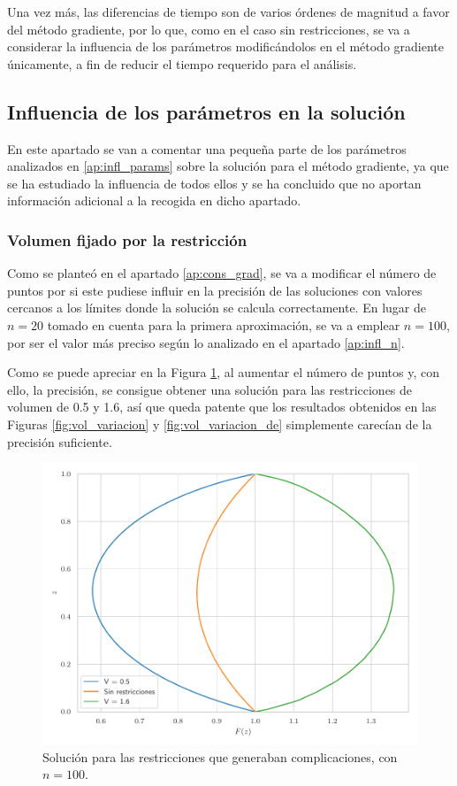 Una vez más, las diferencias de tiempo son de varios órdenes de magnitud a favor del método gradiente, por lo que, como en el caso sin restricciones, se va a considerar la influencia de los parámetros modificándolos en el método gradiente únicamente, a fin de reducir el tiempo requerido para el análisis.

\subsection{Influencia de los parámetros en la solución}

En este apartado se van a comentar una pequeña parte de los parámetros analizados en \ref{ap:infl_params} sobre la solución para el método gradiente, ya que se ha estudiado la influencia de todos ellos y se ha concluido que no aportan información adicional a la recogida en dicho apartado. 

\subsubsection{Volumen fijado por la restricción}

Como se planteó en el apartado \ref{ap:cons_grad}, se va a modificar el número de puntos por si este pudiese influir en la precisión de las soluciones con valores cercanos a los límites donde la solución se calcula correctamente. En lugar de $n = 20$ tomado en cuenta para la primera aproximación, se va a emplear $n = 100$, por ser el valor más preciso según lo analizado en el apartado \ref{ap:infl_n}.

Como se puede apreciar en la Figura \ref{fig:vol_sol_n100}, al aumentar el número de puntos y, con ello, la precisión, se consigue obtener una solución para las restricciones de volumen de 0.5 y 1.6, así que queda patente que los resultados obtenidos en las Figuras \ref{fig:vol_variacion} y \ref{fig:vol_variacion_de} simplemente carecían de la precisión suficiente. 

\begin{figure}[h]
    \centering
    \includegraphics[width = 0.6 \linewidth]{Figures/01/vol_sol_n100.pdf}
    \caption{Solución para las restricciones que generaban complicaciones, con $n = 100$.}
    \label{fig:vol_sol_n100}
\end{figure}

